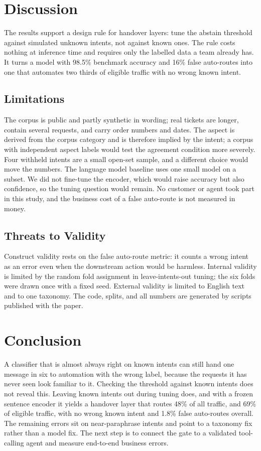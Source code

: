 \documentclass{icaiit2027}
\begin{document}
\section{Discussion}

The results support a design rule for handover layers: tune the abstain threshold against simulated unknown intents, not against known ones. The rule costs nothing at inference time and requires only the labelled data a team already has. It turns a model with 98.5\% benchmark accuracy and 16\% false auto-routes into one that automates two thirds of eligible traffic with no wrong known intent.

\subsection{Limitations}

The corpus is public and partly synthetic in wording; real tickets are longer, contain several requests, and carry order numbers and dates. The aspect is derived from the corpus category and is therefore implied by the intent; a corpus with independent aspect labels would test the agreement condition more severely. Four withheld intents are a small open-set sample, and a different choice would move the numbers. The language model baseline uses one small model on a subset. We did not fine-tune the encoder, which would raise accuracy but also confidence, so the tuning question would remain. No customer or agent took part in this study, and the business cost of a false auto-route is not measured in money.

\subsection{Threats to Validity}

Construct validity rests on the false auto-route metric: it counts a wrong intent as an error even when the downstream action would be harmless. Internal validity is limited by the random fold assignment in leave-intents-out tuning; the six folds were drawn once with a fixed seed. External validity is limited to English text and to one taxonomy. The code, splits, and all numbers are generated by scripts published with the paper.

\section{Conclusion}

A classifier that is almost always right on known intents can still hand one message in six to automation with the wrong label, because the requests it has never seen look familiar to it. Checking the threshold against known intents does not reveal this. Leaving known intents out during tuning does, and with a frozen sentence encoder it yields a handover layer that routes 48\% of all traffic, and 69\% of eligible traffic, with no wrong known intent and 1.8\% false auto-routes overall. The remaining errors sit on near-paraphrase intents and point to a taxonomy fix rather than a model fix. The next step is to connect the gate to a validated tool-calling agent and measure end-to-end business errors.


\end{document}
